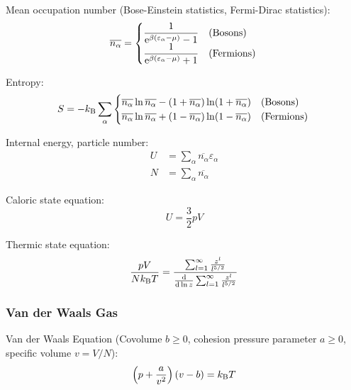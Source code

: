 			\noindent
			Mean occupation number (Bose-Einstein statistics, Fermi-Dirac statistics):
			\begin{equation}
				\overline{n_\alpha} =
				\begin{cases}
					\dfrac{1}{\mathrm{e}^{\beta(\varepsilon_\alpha-\mu)} - 1} & \text{(Bosons)} \\
					\dfrac{1}{\mathrm{e}^{\beta(\varepsilon_\alpha-\mu)} + 1} & \text{(Fermions)}
				\end{cases} \\
			\end{equation}

			\noindent
			Entropy:
			\begin{equation}
				S= -k_{\text{B}}\sum_\alpha
				\begin{cases}
					\overline{n_\alpha} \ln \overline{n_\alpha} - (1+\overline{n_\alpha}) \ln (1+\overline{n_\alpha}) & \text{(Bosons)} \\
					\overline{n_\alpha} \ln \overline{n_\alpha} + (1-\overline{n_\alpha}) \ln (1-\overline{n_\alpha}) & \text{(Fermions)}
				\end{cases} \\
			\end{equation}

			\noindent
			Internal energy, particle number:
			\begin{equation}
				\begin{aligned}
					U &= \sum_\alpha \overline{n_\alpha} \varepsilon_\alpha \\
					N &= \sum_\alpha \overline{n_\alpha}
				\end{aligned}
			\end{equation}

			\noindent
			Caloric state equation:
			\begin{equation}
				U=\frac{3}{2}pV
			\end{equation}

			\noindent
			Thermic state equation:
			\begin{equation}
				\frac{pV}{N k_{\text{B}} T} = \frac{\sum_{l=1}^{\infty}\frac{z^l}{l^{5/2}}}{\dv{\ln z}\sum_{l=1}^{\infty}\frac{z^l}{l^{5/2}}}
			\end{equation}

		\subsubsection{Van der Waals Gas}
			\noindent
			Van der Waals Equation (Covolume $b \ge 0$, cohesion pressure parameter $a \ge 0$, specific volume $v=V/N$):
			\begin{equation}
				\left( p+\frac{a}{v^2} \right) \left( v-b \right) = k_{\text{B}} T
			\end{equation}

